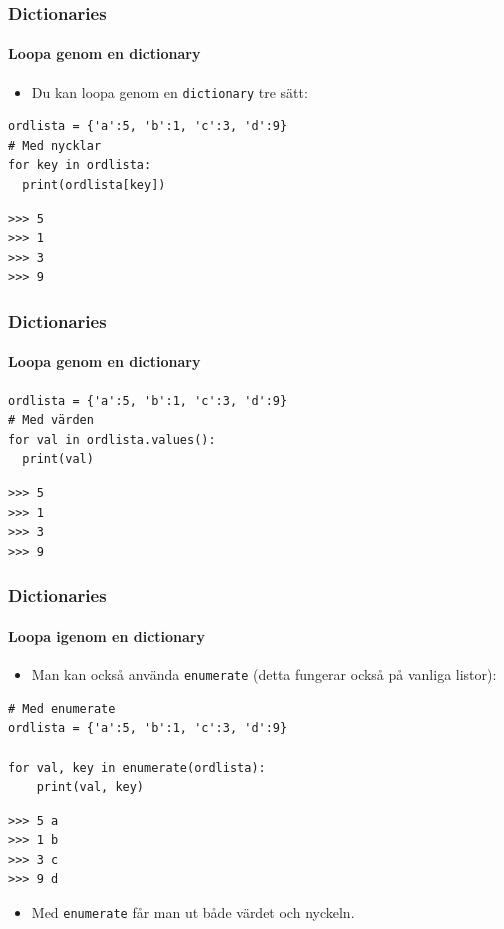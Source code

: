 \documentclass[aspectratio=169]{beamer}
\begin{document}
\begin{frame}[fragile]
\frametitle{Dictionaries}
\framesubtitle{Loopa genom en dictionary}

\begin{itemize}
	\item Du kan loopa genom en \lstinline{dictionary} tre sätt:
\end{itemize}

\begin{lstlisting}
ordlista = {'a':5, 'b':1, 'c':3, 'd':9}
# Med nycklar
for key in ordlista:
  print(ordlista[key])
\end{lstlisting}

\begin{lstlisting}
>>> 5
>>> 1
>>> 3
>>> 9
\end{lstlisting}

\end{frame}

\begin{frame}[fragile]
	\frametitle{Dictionaries}
	\framesubtitle{Loopa genom en dictionary}
	
	\begin{lstlisting}
ordlista = {'a':5, 'b':1, 'c':3, 'd':9}
# Med värden
for val in ordlista.values():
  print(val)
	\end{lstlisting}
	
	\begin{lstlisting}
>>> 5
>>> 1
>>> 3
>>> 9
\end{lstlisting}


\end{frame}

\begin{frame}[fragile]
	\frametitle{Dictionaries}
	\framesubtitle{Loopa igenom en dictionary}
	
	\begin{itemize}
		\item Man kan också använda \lstinline{enumerate} (detta fungerar också på vanliga listor):
	\end{itemize}
	
	\begin{lstlisting}
# Med enumerate
ordlista = {'a':5, 'b':1, 'c':3, 'd':9}

for val, key in enumerate(ordlista):
	print(val, key)
	\end{lstlisting}
	
	\begin{lstlisting}
>>> 5 a
>>> 1 b
>>> 3 c
>>> 9 d
\end{lstlisting}
	
	\begin{itemize}
		\item Med \lstinline{enumerate} får man ut både värdet och nyckeln.
	\end{itemize}
	
\end{frame}
\end{document}
